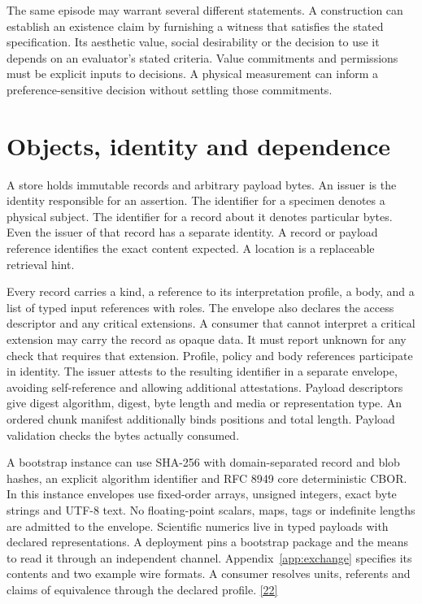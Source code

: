 \documentclass[11pt,a4paper]{article}
\newcommand{\partpage}[1]{\clearpage\section{#1}}
\newcommand{\topic}[1]{\par\smallskip{\sffamily\bfseries\color{ink}#1\par}\nobreak}
\newcommand{\src}[1]{\hyperlink{ref#1}{[#1]}}
\begin{document}
The same episode may warrant several different statements. A construction can establish an existence claim by furnishing a witness that satisfies the stated specification. Its aesthetic value, social desirability or the decision to use it depends on an evaluator's stated criteria. Value commitments and permissions must be explicit inputs to decisions. A physical measurement can inform a preference-sensitive decision without settling those commitments.

\partpage{Objects, identity and dependence}
A store holds immutable records and arbitrary payload bytes. An issuer is the identity responsible for an assertion. The identifier for a specimen denotes a physical subject. The identifier for a record about it denotes particular bytes. Even the issuer of that record has a separate identity. A record or payload reference identifies the exact content expected. A location is a replaceable retrieval hint.

\topic{Envelope}
Every record carries a kind, a reference to its interpretation profile, a body, and a list of typed input references with roles. The envelope also declares the access descriptor and any critical extensions. A consumer that cannot interpret a critical extension may carry the record as opaque data. It must report unknown for any check that requires that extension. Profile, policy and body references participate in identity. The issuer attests to the resulting identifier in a separate envelope, avoiding self-reference and allowing additional attestations. Payload descriptors give digest algorithm, digest, byte length and media or representation type. An ordered chunk manifest additionally binds positions and total length. Payload validation checks the bytes actually consumed.

A bootstrap instance can use SHA-256 with domain-separated record and blob hashes, an explicit algorithm identifier and RFC 8949 core deterministic CBOR. In this instance envelopes use fixed-order arrays, unsigned integers, exact byte strings and UTF-8 text. No floating-point scalars, maps, tags or indefinite lengths are admitted to the envelope. Scientific numerics live in typed payloads with declared representations. A deployment pins a bootstrap package and the means to read it through an independent channel. Appendix~\ref{app:exchange} specifies its contents and two example wire formats. A consumer resolves units, referents and claims of equivalence through the declared profile. \src{22}
\end{document}
